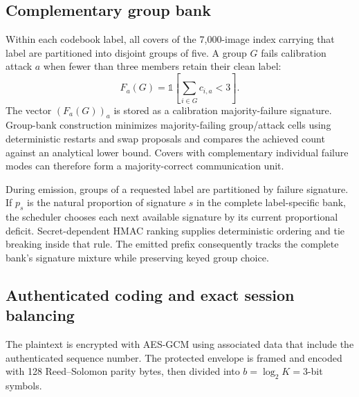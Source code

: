 \subsection{Complementary group bank}
Within each codebook label, all covers of the 7,000-image index carrying that label are partitioned into disjoint groups of five. A group $G$ fails calibration attack $a$ when fewer than three members retain their clean label:
\begin{equation}
F_a(G)=\mathbb{1}\!\left[\sum_{i\in G} c_{i,a}<3\right].
\end{equation}
The vector $(F_a(G))_a$ is stored as a calibration majority-failure signature. Group-bank construction minimizes majority-failing group/attack cells using deterministic restarts and swap proposals and compares the achieved count against an analytical lower bound. Covers with complementary individual failure modes can therefore form a majority-correct communication unit.

During emission, groups of a requested label are partitioned by failure signature. If $p_s$ is the natural proportion of signature $s$ in the complete label-specific bank, the scheduler chooses each next available signature by its current proportional deficit. Secret-dependent HMAC ranking supplies deterministic ordering and tie breaking inside that rule. The emitted prefix consequently tracks the complete bank's signature mixture while preserving keyed group choice.

\subsection{Authenticated coding and exact session balancing}
The plaintext is encrypted with AES-GCM using associated data that include the authenticated sequence number. The protected envelope is framed and encoded with 128 Reed--Solomon parity bytes, then divided into $b=\log_2K=3$-bit symbols.

